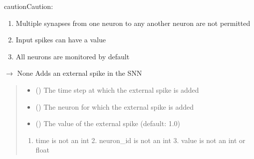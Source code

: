 \documentclass[letterpaper,10pt,english]{sphinxmanual}
\begin{document}
\begin{fulllineitems}
\begin{sphinxadmonition}{caution}{Caution:}
\begin{enumerate}
\item {} 
\sphinxAtStartPar
Multiple synapses from one neuron to any another neuron are not permitted

\item {} 
\sphinxAtStartPar
Input spikes can have a value

\item {} 
\sphinxAtStartPar
All neurons are monitored by default

\end{enumerate}
\end{sphinxadmonition}

\begin{fulllineitems}
\label{\detokenize{index:id0}}
\pysigstartsignatures
\pysiglinewithargsret
{}
{\sphinxparamcomma {}\sphinxparamcomma {}}
{{ $\rightarrow$ None}}
\pysigstopsignatures
\sphinxAtStartPar
Adds an external spike in the SNN
\begin{quote}\begin{description}
\begin{itemize}
\item {} 
\sphinxAtStartPar
{} () \textendash{} The time step at which the external spike is added

\item {} 
\sphinxAtStartPar
{} () \textendash{} The neuron for which the external spike is added

\item {} 
\sphinxAtStartPar
{} () \textendash{} The value of the external spike (default: 1.0)

\end{itemize}

\sphinxAtStartPar
{} \textendash{} \begin{enumerate}
%
\item {} 
\sphinxAtStartPar
time is not an int
    2. neuron\_id is not an int
    3. value is not an int or float


\end{enumerate}
\end{description}
\end{quote}
\end{fulllineitems}
\end{fulllineitems}
\end{document}
